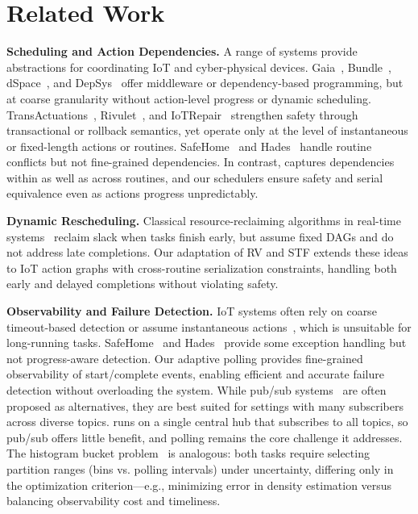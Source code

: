 \section{Related Work}
\label{sec:related-work}

{
\noindent \textbf{Scheduling and Action Dependencies.}  
A range of systems provide abstractions for coordinating IoT and cyber-physical devices. 
Gaia~\cite{gaia}, Bundle~\cite{vicaire2010bundle}, dSpace~\cite{fu2021dspace}, and DepSys~\cite{depsys} offer middleware or dependency-based programming, but at coarse granularity without action-level progress or dynamic scheduling. 
TransActuations~\cite{transactuations}, Rivulet~\cite{rivulet}, and IoTRepair~\cite{iotrepair2020} strengthen safety through transactional or rollback semantics, yet operate only at the level of instantaneous or fixed-length actions or routines. 
SafeHome~\cite{SafeHomeEuroSys2021} and Hades~\cite{hades} handle routine conflicts but not fine-grained dependencies. 
In contrast, \sysname{} captures dependencies within as well as across routines, and our schedulers ensure safety and serial equivalence even as actions progress unpredictably.

\noindent \textbf{Dynamic Rescheduling.}  
Classical resource-reclaiming algorithms in real-time systems~\cite{shen1993resource,manimaran1997new,gupta2000new} reclaim slack when tasks finish early, but assume fixed DAGs and do not address late completions. 
Our adaptation of RV and STF extends these ideas to IoT action graphs with cross-routine serialization constraints, handling both early and delayed completions without violating safety.

\noindent \textbf{Observability and Failure Detection.}  
IoT systems often rely on coarse timeout-based detection or assume instantaneous actions~\cite{kashef2021wireless}, which is unsuitable for long-running tasks. 
SafeHome~\cite{SafeHomeEuroSys2021} and Hades~\cite{hades} provide some exception handling but not progress-aware detection. 
Our adaptive polling provides fine-grained observability of start/complete events, enabling efficient and accurate failure detection without overloading the system.
While pub/sub systems~\cite{gryphon,carzaniga2001design,aguilera1999matching,segall1997elvin} are often proposed as alternatives, they are best suited for settings with many subscribers across diverse topics. \sysname{} runs on a single central hub that subscribes to all topics, so pub/sub offers little benefit, and polling remains the core challenge it addresses.
The histogram bucket problem~\cite{scott1979optimal,freedman1981histogram,knuth2006optimal,scargle2013studies,jagadish1998optimal} is analogous: both tasks require selecting partition ranges (bins vs. polling intervals) under uncertainty, differing only in the optimization criterion—e.g., minimizing error in density estimation versus balancing observability cost and timeliness.

}
